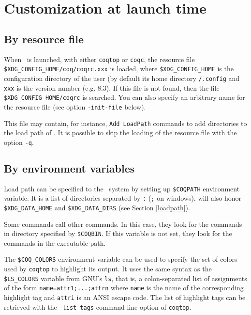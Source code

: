 \section[Customization]{Customization at launch time}

\subsection{By resource file}

When \Coq\ is launched, with either {\tt coqtop} or {\tt coqc}, the
resource file \verb:$XDG_CONFIG_HOME/coq/coqrc.xxx: is loaded, where
\verb:$XDG_CONFIG_HOME: is the configuration directory of the user (by
default its home directory \verb!/.config! and \verb:xxx: is the version
number (e.g. 8.3).  If this file is not found, then the file
\verb:$XDG_CONFIG_HOME/coqrc: is searched. You can also specify an
arbitrary name for the resource file (see option \verb:-init-file:
below).


This file may contain, for instance, \verb:Add LoadPath: commands to add
directories to the load path of \Coq.
It is possible to skip the loading of the resource file with the
option \verb:-q:.

\subsection{By environment variables\label{EnvVariables}
\label{envars}}

Load path can be specified to the \Coq\ system by setting up
\verb:$COQPATH: environment variable. It is a list of directories
separated by \verb|:| (\verb|;| on windows). {\Coq} will also honor
\verb:$XDG_DATA_HOME: and \verb:$XDG_DATA_DIRS: (see Section
\ref{loadpath}).

Some {\Coq} commands call other {\Coq} commands. In this case, they
look for the commands in directory specified by \verb:$COQBIN:. If
this variable is not set, they look for the commands in the executable
path.

The \verb:$COQ_COLORS: environment variable can be used to specify the set of
colors used by {\tt coqtop} to highlight its output. It uses the same syntax as
the \verb:$LS_COLORS: variable from GNU's {\tt ls}, that is, a colon-separated
list of assignments of the form \verb:name=attr1;...;attrn: where {\tt name} is
the name of the corresponding highlight tag and {\tt attri} is an ANSI escape
code. The list of highlight tags can be retrieved with the {\tt -list-tags}
command-line option of {\tt coqtop}.

